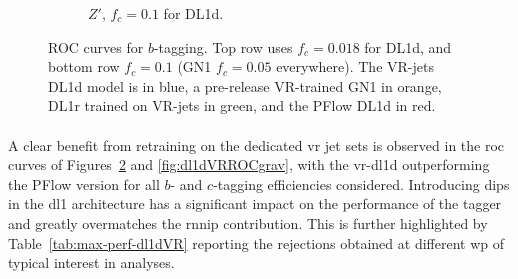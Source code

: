 \begin{figure}[h!]
\begin{subfigure}[t]{0.48\textwidth}
    \caption{$Z'$, $f_c = 0.1$ for DL1d.}
    \label{fig:dl1dVRROCzpc}
  \end{subfigure}
  \caption{ROC curves for $b$-tagging. Top row uses $f_c = 0.018$ for DL1d, and bottom row $f_c = 0.1$ (GN1 $f_c = 0.05$ everywhere). The VR-jets DL1d model is in blue, a pre-release VR-trained GN1 in orange, DL1r trained on VR-jets in green, and the PFlow DL1d in red.}
  \label{fig:dl1dVRROC}
\end{figure}

\paragraph{}A clear benefit from retraining on the dedicated \gls{vr} jet sets is observed in the \gls{roc} curves of Figures~\ref{fig:dl1dVRROC} and \ref{fig:dl1dVRROCgrav}, with the \gls{vr}-\gls{dl1d} outperforming the PFlow version for all $b$- and $c$-tagging efficiencies considered. Introducing \gls{dips} in the \gls{dl1} architecture has a significant impact on the performance of the tagger and greatly overmatches the \gls{rnnip} contribution. This is further highlighted by Table~\ref{tab:max-perf-dl1dVR} reporting the rejections obtained at different \gls{wp} of typical interest in analyses. \\

